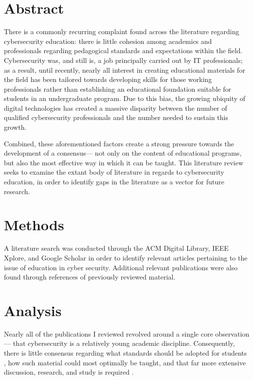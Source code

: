 \providecommand{\heading}[1]{\section{#1}}
\providecommand{\subheading}[1]{\subsection{#1}}

\ifshowabstract
\heading{Abstract}

    There is a commonly recurring complaint found across the literature regarding cybersecurity education: there is little cohesion among academics and professionals regarding pedagogical standards and expectations within the field. %
Cybersecurity was, and still is, a job principally carried out by IT professionals; %
as a result, until recently, nearly all interest in creating educational materials for the field has been tailored towards developing skills for those working professionals rather than establishing an educational foundation suitable for students in an undergraduate program. %
Due to this bias, the growing ubiquity of digital technologies has created a massive disparity between the number of qualified cybersecurity professionals and the number needed to sustain this growth. 
    
    Combined, these aforementioned factors create a strong pressure towards the development of a consensus---%
not only on the content of educational programs, but also the most effective way in which it can be taught. %
This literature review seeks to examine the extant body of literature in regards to cybersecurity education, in order to identify gaps in the literature as a vector for future research.
\fi

\heading{Methods}

    A literature search was conducted through the ACM Digital Library, IEEE Xplore, and Google Scholar in order to identify relevant articles pertaining to the issue of education in cyber security. %
Additional relevant publications were also found through references of previously reviewed material.

\heading{Analysis}

    Nearly all of the publications I reviewed revolved around a single core observation---%
that cybersecurity is a relatively young academic discipline. %
Consequently, there is little consensus regarding what standards should be adopted for students \cite{R-Raj}, how such material could most optimally be taught, and that far more extensive discussion, research, and study is required \cite{Z-Zeng}. 
    
